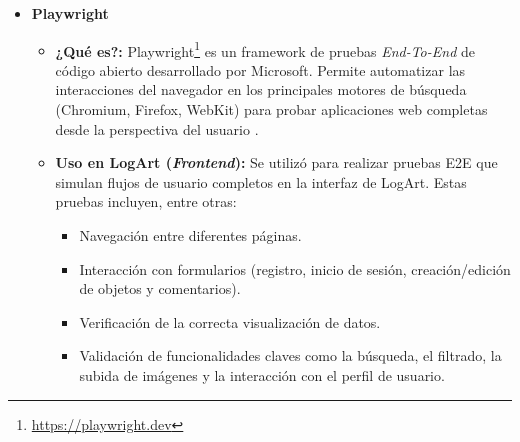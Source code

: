 \begin{itemize}
\begin{itemize}
                \item \textbf{¿Qué es?:} Supertest\footnote{\url{https://npmjs.com/package/supertest}} es una librería de alto nivel construida sobre Superagent (un cliente HTTP) que facilita la prueba de APIs HTTP. Permite realizar peticiones a los endpoints de la aplicación y realizar aserciones sobre las respuestas (código de estado, cabeceras, cuerpo) \cite{abidullahSupertest}.
                \item \textbf{Uso en LogArt (\textit{Backend}):} Se empleó junto con Jest para las pruebas de integración de la API RESTful del \textit{backend}. Permitió simular peticiones HTTP a los diferentes endpoints de LogArt y verificar que las respuestas fueran las esperadas en términos de códigos de estado, contenido y estructura del JSON devuelto.
                \item \textbf{Versión:} Se utilizó la versión \textbf{v7.0.0}.
            \end{itemize}
        \vspace{0.3cm}
        \item \textbf{Playwright}
            \begin{itemize}
                \item \textbf{¿Qué es?:} Playwright\footnote{\url{https://playwright.dev}} es un framework de pruebas \textit{End-To-End} de código abierto desarrollado por Microsoft. Permite automatizar las interacciones del navegador en los principales motores de búsqueda (Chromium, Firefox, WebKit) para probar aplicaciones web completas desde la perspectiva del usuario \cite{luxequalityPlaywrightE2E}.
                \item \textbf{Uso en LogArt (\textit{Frontend}):} Se utilizó para realizar pruebas E2E que simulan flujos de usuario completos en la interfaz de LogArt. Estas pruebas incluyen, entre otras:
                    \begin{itemize}
                        \item Navegación entre diferentes páginas.
                        \item Interacción con formularios (registro, inicio de sesión, creación/edición de objetos y comentarios).
                        \item Verificación de la correcta visualización de datos.
                        \item Validación de funcionalidades claves como la búsqueda, el filtrado, la subida de imágenes y la interacción con el perfil de usuario.
                    \end{itemize}

\end{itemize}
\end{itemize}
